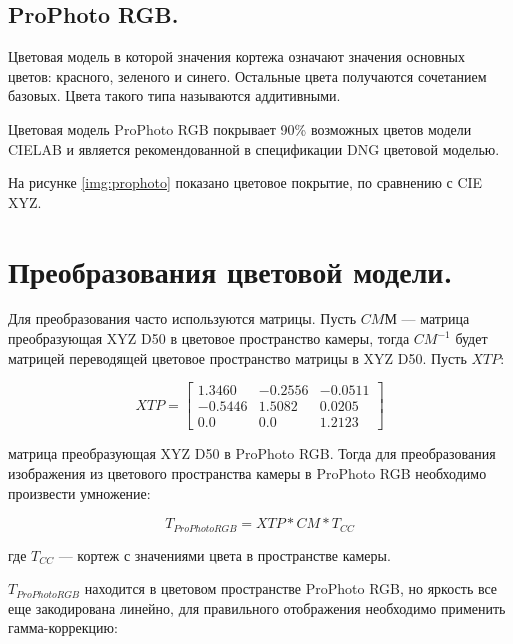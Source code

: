 
\subsection{ProPhoto RGB.}
Цветовая модель в которой значения кортежа означают значения основных цветов: красного, зеленого и синего. Остальные цвета получаются сочетанием базовых. Цвета такого типа называются аддитивными.

Цветовая модель ProPhoto RGB покрывает 90\% возможных цветов модели CIELAB и является рекомендованной в спецификации DNG цветовой моделью. \cite{dngspec}

 На рисунке \ref{img:prophoto} показано цветовое покрытие, по сравнению с CIE XYZ.


\section{Преобразования цветовой модели.}

Для преобразования часто используются матрицы. Пусть $CMМ$ --- матрица преобразующая XYZ D50 в цветовое пространство камеры, тогда $CM^{-1}$ будет матрицей переводящей цветовое пространство матрицы в XYZ D50. Пусть $XTP$:

\begin{equation}
	\label{XTP}
	XTP = \begin{bmatrix}
			1.3460 & -0.2556 & -0.0511 \\
			-0.5446 & 1.5082 & 0.0205 \\
			0.0 & 0.0 & 1.2123 
		\end{bmatrix}
\end{equation}

матрица преобразующая XYZ D50 в ProPhoto RGB. Тогда для преобразования изображения из цветового пространства камеры в ProPhoto RGB необходимо произвести умножение:

\begin{equation}
	\label{tosrgb}
	T_{ProPhoto RGB} = XTP * CM * T_{CC}
\end{equation}

где $T_{CC}$ --- кортеж с значениями цвета в пространстве камеры.

$T_{ProPhoto RGB}$ находится в цветовом пространстве ProPhoto RGB, но яркость все еще закодирована линейно, для правильного отображения необходимо применить гамма-коррекцию:


